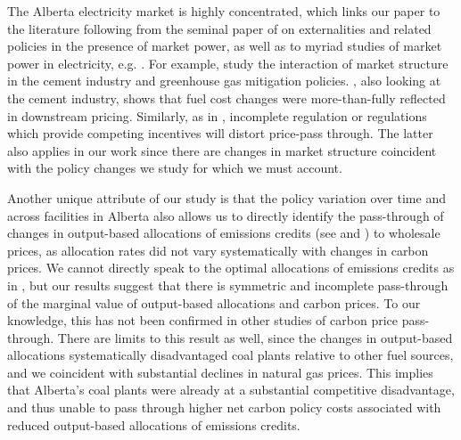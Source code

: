\documentclass[12pt]{article}
\begin{document}
The Alberta electricity market is highly concentrated, which links our paper to the literature following from the seminal paper of \cite{buchanan1969external} on externalities and related policies in the presence of market power, as well as to myriad studies of market power in electricity, e.g. \cite{borenstein_bushnell_wolak_2002}. For example, \cite{fowlie_reguant_ryan_2016} study the interaction of market structure in the cement industry and greenhouse gas mitigation policies. \cite{miller_cement}, also looking at the cement industry, shows that fuel cost changes were more-than-fully reflected in downstream pricing. Similarly, as in \cite{holland_emissions_2012}, incomplete regulation or regulations which provide competing incentives will distort price-pass through. The latter also applies in our work since there are changes in market structure coincident with the policy changes we study for which we must account. 

Another unique attribute of our study is that the policy variation over time and across facilities in Alberta also allows us to directly identify the pass-through of changes in output-based allocations of emissions credits (see \cite{fischerfox07} and \cite{fischerfox12}) to wholesale prices, as allocation rates did not vary systematically with changes in carbon prices. We cannot directly speak to the optimal allocations of emissions credits as in \cite{burtraw_palmer_2008}, but our results suggest that there is symmetric and incomplete pass-through of the marginal value of output-based allocations and carbon prices. To our knowledge, this has not been confirmed in other studies of carbon price pass-through. There are limits to this result as well, since the changes in output-based allocations systematically disadvantaged coal plants relative to other fuel sources, and we coincident with substantial declines in natural gas prices. This implies that Alberta's coal plants were already at a substantial competitive disadvantage, and thus unable to pass through higher net carbon policy costs associated with reduced output-based allocations of emissions credits.
\end{document}
